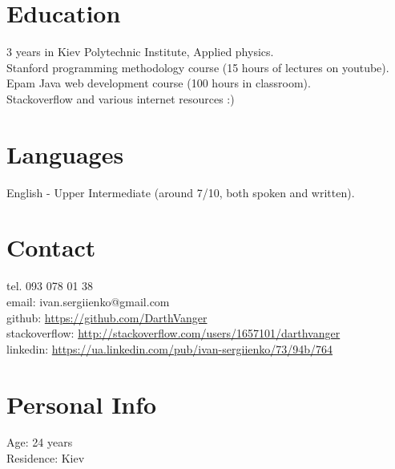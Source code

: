 \documentclass[a4paper, 14pt]{article}
\begin{document}
\section{Education}
	3 years in Kiev Polytechnic Institute, Applied physics. \\
	Stanford programming methodology course (15 hours of lectures on youtube). \\
	Epam Java web development course (100 hours in classroom). \\
	Stackoverflow and various internet resources :)
\section{Languages}
	English - Upper Intermediate (around 7/10, both spoken and written).
\section{Contact}
	tel. 093 078 01 38 \\
	email: ivan.sergiienko@gmail.com \\
    github: \url{https://github.com/DarthVanger} \\
    stackoverflow: \url{http://stackoverflow.com/users/1657101/darthvanger} \\
    linkedin: \url{https://ua.linkedin.com/pub/ivan-sergiienko/73/94b/764}
\section{Personal Info}
	Age: 24 years \\
	Residence: Kiev
\end{document}
